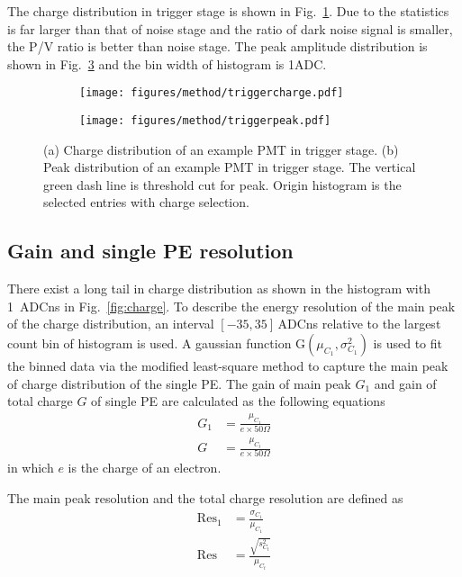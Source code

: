 The charge distribution in trigger stage is shown in Fig.~\ref{fig:triggercharge}. Due to the statistics is far larger than that of noise stage and the ratio of dark noise signal is smaller, the P/V ratio is better than noise stage. The peak amplitude distribution is shown in Fig.~\ref{fig:triggerpeak} and the bin width of histogram is 1ADC.
\begin{figure}[!htbp]
    \centering
    \begin{subfigure}[b]{0.49\textwidth}
        \texttt{[image: figures/method/triggercharge.pdf]}
        \caption{}%
        \label{fig:triggercharge}
    \end{subfigure}
    \begin{subfigure}[b]{0.49\textwidth}
        \texttt{[image: figures/method/triggerpeak.pdf]}
        \caption{}%
        \label{fig:triggerpeak}
    \end{subfigure}
    \caption{(a) Charge distribution of an example PMT in trigger stage. (b) Peak distribution of an example PMT in trigger stage. The vertical green dash line is threshold cut for peak. Origin histogram is the selected entries with charge selection.}
\end{figure}

\subsection{Gain and single PE resolution}
\label{sec:noisegain}
There exist a long tail in charge distribution as shown in the histogram with \SI{1}{ADCns} in Fig.~\ref{fig:charge}. To describe the energy resolution of the main peak of the charge distribution, an interval $[-35, 35]$\,ADCns relative to the largest count bin of histogram is used. A gaussian function G$(\mu_{C_1},\sigma^2_{C_1})$ is used to fit the binned data via the modified least-square method \cite{Cowan1998StatisticalDA} to capture the main peak of charge distribution of the single PE. The gain of main peak $G_1$ and gain of total charge $G$ of single PE are calculated as the following equations
\begin{align}
    G_1&=\frac{\mu_{C_1}}{e\times 50\Omega} \\
    G &= \frac{\mu_{C_t}}{e\times 50\Omega}
\end{align}
in which $e$ is the charge of an electron.

The main peak resolution and the total charge resolution are defined as
\begin{align}
    \mathrm{Res}_1&=\frac{\sigma_{C_1}}{\mu_{C_1}}\\
    \mathrm{Res}&=\frac{\sqrt{s^2_{C_t}}}{\mu_{C_t}}
\end{align}

